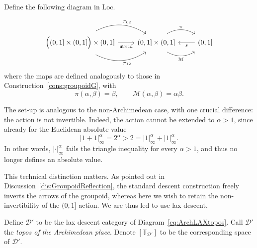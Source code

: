 \documentclass[a4paper, 11pt,reqno]{amsart}
\newcommand{\id}{\mathrm{id}}
\newcommand{\Loc}{\mathrm{Loc}}
\newcommand{\M}{\mathcal{M}}
\newcommand{\m}{\mathfrak{m}}
\newcommand{\thT}{\mathbb{T}}
\newcommand{\D}{\mathcal{D}}
\begin{document}
\begin{construction}\label{cons:ArchLAXtopos} Define the following diagram in $\Loc$.
	
	\begin{equation}\label{eq:ArchLAXtopos}
	\begin{tikzcd} \Big((0,1]\times (0,1] \Big) \times (0,1]\ar[r, bend right, shift right=1ex, swap, "\pi_{12}"] \ar[r,swap,"\m\times \id"] \ar[r,bend left, shift left=1ex,  "\pi_{02}"]& (0,1]\times (0,1] \ar[r, bend right,shift right=1ex, swap, "\M"] \ar[r, bend left, shift left=1ex, "\pi"] & (0,1] \ar[l, "s"] \end{tikzcd}
	\end{equation}
	where the maps are defined analogously to those in Construction~\ref{cons:groupoidG}, with
$$	\pi(\alpha,\beta)=\beta,
\qquad
\M(\alpha,\beta)=\alpha\beta.$$

	
\end{construction}

The set-up is analogous to the non-Archimedean case, with one crucial difference: the action is not invertible. Indeed, the action cannot be extended to $\alpha>1$, since already for the Euclidean absolute value 
$$|1+1|_{\infty}^\alpha=2^\alpha>2=|1|_{\infty}^\alpha+|1|_{\infty}^\alpha.$$
In other words, $|\cdot|_\infty^\alpha$ fails the triangle inequality for every $\alpha>1$, and thus no longer defines an absolute value.

This technical distinction matters. As pointed out in Discussion~\ref{dis:GroupoidReflection}, the standard descent construction freely inverts the arrows of the groupoid, whereas here we wish to retain the non-invertibility of the $(0,1]$-action. We are thus led to use lax descent. 


\begin{definition}\label{def:LAXdescent} 
Define $\D'$ to be the lax descent category of Diagram~\eqref{eq:ArchLAXtopos}. Call $\D'$ the \emph{topos of the Archimedean place}. Denote $[\thT_{\D'}]$ to be the corresponding space of $\D'$.
\end{definition}
\end{document}
